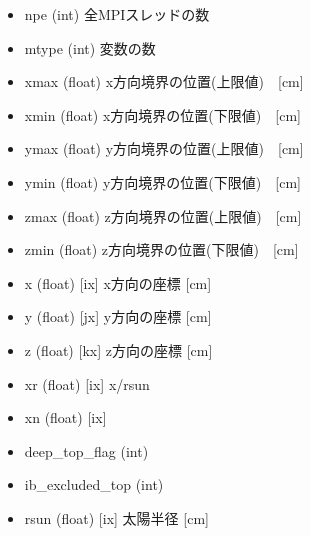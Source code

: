 \documentclass[letterpaper,10pt,dvipdfmx,report]{sphinxmanual}
\begin{document}
\begin{itemize}
\item {} 
\sphinxAtStartPar
npe (int) \sphinxhyphen{}\sphinxhyphen{} 全MPIスレッドの数 

\item {} 
\sphinxAtStartPar
mtype (int) \sphinxhyphen{}\sphinxhyphen{} 変数の数

\item {} 
\sphinxAtStartPar
xmax (float) \sphinxhyphen{}\sphinxhyphen{} x方向境界の位置(上限値)　{[}cm{]}

\item {} 
\sphinxAtStartPar
xmin (float) \sphinxhyphen{}\sphinxhyphen{} x方向境界の位置(下限値)　{[}cm{]}

\item {} 
\sphinxAtStartPar
ymax (float) \sphinxhyphen{}\sphinxhyphen{} y方向境界の位置(上限値)　{[}cm{]}

\item {} 
\sphinxAtStartPar
ymin (float) \sphinxhyphen{}\sphinxhyphen{} y方向境界の位置(下限値)　{[}cm{]}

\item {} 
\sphinxAtStartPar
zmax (float) \sphinxhyphen{}\sphinxhyphen{} z方向境界の位置(上限値)　{[}cm{]}

\item {} 
\sphinxAtStartPar
zmin (float) \sphinxhyphen{}\sphinxhyphen{} z方向境界の位置(下限値)　{[}cm{]}

\item {} 
\sphinxAtStartPar
x (float) {[}ix{]} \sphinxhyphen{}\sphinxhyphen{} x方向の座標 {[}cm{]}

\item {} 
\sphinxAtStartPar
y (float) {[}jx{]} \sphinxhyphen{}\sphinxhyphen{} y方向の座標 {[}cm{]}

\item {} 
\sphinxAtStartPar
z (float) {[}kx{]} \sphinxhyphen{}\sphinxhyphen{} z方向の座標 {[}cm{]}

\item {} 
\sphinxAtStartPar
xr (float) {[}ix{]} \sphinxhyphen{}\sphinxhyphen{} x/rsun

\item {} 
\sphinxAtStartPar
xn (float) {[}ix{]} \sphinxhyphen{}\sphinxhyphen{} 

\item {} 
\sphinxAtStartPar
deep\_top\_flag (int) \sphinxhyphen{}\sphinxhyphen{}

\item {} 
\sphinxAtStartPar
ib\_excluded\_top (int) \sphinxhyphen{}\sphinxhyphen{}

\item {} 
\sphinxAtStartPar
rsun (float) {[}ix{]} \sphinxhyphen{}\sphinxhyphen{} 太陽半径 {[}cm{]}

\end{itemize}
\end{document}

